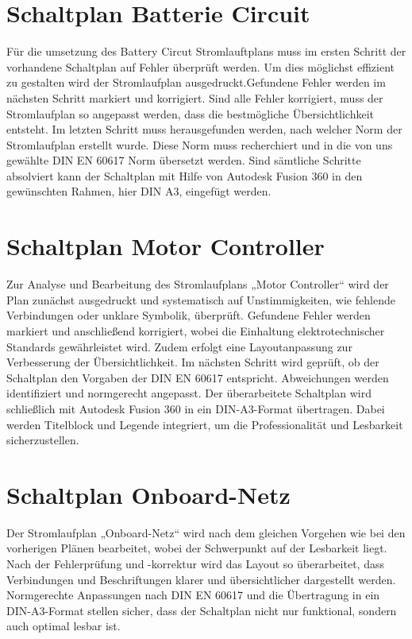 \section*{Schaltplan Batterie Circuit}
Für die umsetzung des Battery Circut Stromlauftplans muss im ersten Schritt der vorhandene Schaltplan auf Fehler überprüft werden. Um dies möglichst effizient zu gestalten wird der Stromlaufplan ausgedruckt.Gefundene Fehler werden im nächsten Schritt markiert und korrigiert. Sind alle Fehler korrigiert, muss der Stromlaufplan so angepasst werden, dass die bestmögliche Übersichtlichkeit entsteht. Im letzten Schritt muss herausgefunden werden, nach welcher Norm der Stromlaufplan erstellt wurde. Diese Norm muss recherchiert und in die von uns gewählte DIN EN 60617 Norm \glqq übersetzt\grqq {} werden. Sind sämtliche Schritte absolviert kann der Schaltplan mit Hilfe von Autodesk Fusion 360 in den gewünschten Rahmen, hier DIN A3, eingefügt werden.
 

\addtocounter{page}{1} 
\section*{Schaltplan Motor Controller}
Zur Analyse und Bearbeitung des Stromlaufplans „Motor Controller“ wird der Plan zunächst ausgedruckt und systematisch auf Unstimmigkeiten, wie fehlende Verbindungen oder unklare Symbolik, überprüft. Gefundene Fehler werden markiert und anschließend korrigiert, wobei die Einhaltung elektrotechnischer Standards gewährleistet wird. Zudem erfolgt eine Layoutanpassung zur Verbesserung der Übersichtlichkeit. Im nächsten Schritt wird geprüft, ob der Schaltplan den Vorgaben der DIN EN 60617 entspricht. Abweichungen werden identifiziert und normgerecht angepasst. Der überarbeitete Schaltplan wird schließlich mit Autodesk Fusion 360 in ein DIN-A3-Format übertragen. Dabei werden Titelblock und Legende integriert, um die Professionalität und Lesbarkeit sicherzustellen. 
 
\addtocounter{page}{1} 
\section*{Schaltplan Onboard-Netz}
Der Stromlaufplan „Onboard-Netz“ wird nach dem gleichen Vorgehen wie bei den vorherigen Plänen bearbeitet, wobei der Schwerpunkt auf der Lesbarkeit liegt. Nach der Fehlerprüfung und -korrektur wird das Layout so überarbeitet, dass Verbindungen und Beschriftungen klarer und übersichtlicher dargestellt werden. Normgerechte Anpassungen nach DIN EN 60617 und die Übertragung in ein DIN-A3-Format stellen sicher, dass der Schaltplan nicht nur funktional, sondern auch optimal lesbar ist.
 
\addtocounter{page}{1} 
